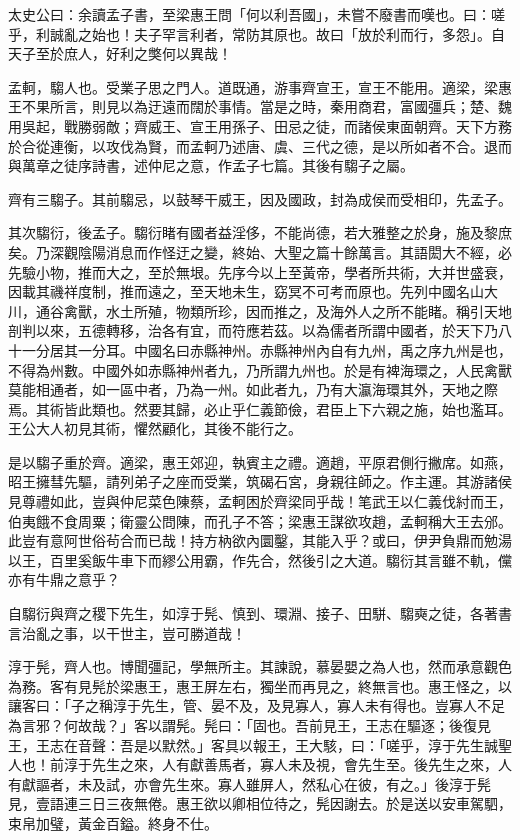 
\begin{pinyinscope}
太史公曰：余讀孟子書，至梁惠王問「何以利吾國」，未嘗不廢書而嘆也。曰：嗟乎，利誠亂之始也！夫子罕言利者，常防其原也。故曰「放於利而行，多怨」。自天子至於庶人，好利之獘何以異哉！

孟軻，騶人也。受業子思之門人。道既通，游事齊宣王，宣王不能用。適梁，梁惠王不果所言，則見以為迂遠而闊於事情。當是之時，秦用商君，富國彊兵；楚、魏用吳起，戰勝弱敵；齊威王、宣王用孫子、田忌之徒，而諸侯東面朝齊。天下方務於合從連衡，以攻伐為賢，而孟軻乃述唐、虞、三代之德，是以所如者不合。退而與萬章之徒序詩書，述仲尼之意，作孟子七篇。其後有騶子之屬。

齊有三騶子。其前騶忌，以鼓琴干威王，因及國政，封為成侯而受相印，先孟子。

其次騶衍，後孟子。騶衍睹有國者益淫侈，不能尚德，若大雅整之於身，施及黎庶矣。乃深觀陰陽消息而作怪迂之變，終始、大聖之篇十餘萬言。其語閎大不經，必先驗小物，推而大之，至於無垠。先序今以上至黃帝，學者所共術，大并世盛衰，因載其禨祥度制，推而遠之，至天地未生，窈冥不可考而原也。先列中國名山大川，通谷禽獸，水土所殖，物類所珍，因而推之，及海外人之所不能睹。稱引天地剖判以來，五德轉移，治各有宜，而符應若茲。以為儒者所謂中國者，於天下乃八十一分居其一分耳。中國名曰赤縣神州。赤縣神州內自有九州，禹之序九州是也，不得為州數。中國外如赤縣神州者九，乃所謂九州也。於是有裨海環之，人民禽獸莫能相通者，如一區中者，乃為一州。如此者九，乃有大瀛海環其外，天地之際焉。其術皆此類也。然要其歸，必止乎仁義節儉，君臣上下六親之施，始也濫耳。王公大人初見其術，懼然顧化，其後不能行之。

是以騶子重於齊。適梁，惠王郊迎，執賓主之禮。適趙，平原君側行撇席。如燕，昭王擁彗先驅，請列弟子之座而受業，筑碣石宮，身親往師之。作主運。其游諸侯見尊禮如此，豈與仲尼菜色陳蔡，孟軻困於齊梁同乎哉！笔武王以仁義伐紂而王，伯夷餓不食周粟；衛靈公問陳，而孔子不答；梁惠王謀欲攻趙，孟軻稱大王去邠。此豈有意阿世俗茍合而已哉！持方枘欲內圜鑿，其能入乎？或曰，伊尹負鼎而勉湯以王，百里奚飯牛車下而繆公用霸，作先合，然後引之大道。騶衍其言雖不軌，儻亦有牛鼎之意乎？

自騶衍與齊之稷下先生，如淳于髡、慎到、環淵、接子、田駢、騶奭之徒，各著書言治亂之事，以干世主，豈可勝道哉！

淳于髡，齊人也。博聞彊記，學無所主。其諫說，慕晏嬰之為人也，然而承意觀色為務。客有見髡於梁惠王，惠王屏左右，獨坐而再見之，終無言也。惠王怪之，以讓客曰：「子之稱淳于先生，管、晏不及，及見寡人，寡人未有得也。豈寡人不足為言邪？何故哉？」客以謂髡。髡曰：「固也。吾前見王，王志在驅逐；後復見王，王志在音聲：吾是以默然。」客具以報王，王大駭，曰：「嗟乎，淳于先生誠聖人也！前淳于先生之來，人有獻善馬者，寡人未及視，會先生至。後先生之來，人有獻謳者，未及試，亦會先生來。寡人雖屏人，然私心在彼，有之。」後淳于髡見，壹語連三日三夜無倦。惠王欲以卿相位待之，髡因謝去。於是送以安車駕駟，束帛加璧，黃金百鎰。終身不仕。


\end{pinyinscope}

